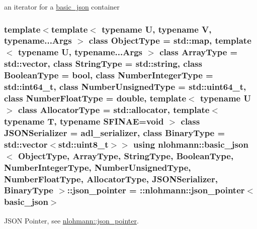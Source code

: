 an iterator for a \hyperlink{classnlohmann_1_1basic__json}{basic\+\_\+json} container 

\subsubsection[{\texorpdfstring{json\+\_\+pointer}{json_pointer}}]{\setlength{\rightskip}{0pt plus 5cm}template$<$template$<$ typename U, typename V, typename...\+Args $>$ class Object\+Type = std\+::map, template$<$ typename U, typename...\+Args $>$ class Array\+Type = std\+::vector, class String\+Type  = std\+::string, class Boolean\+Type  = bool, class Number\+Integer\+Type  = std\+::int64\+\_\+t, class Number\+Unsigned\+Type  = std\+::uint64\+\_\+t, class Number\+Float\+Type  = double, template$<$ typename U $>$ class Allocator\+Type = std\+::allocator, template$<$ typename T, typename S\+F\+I\+N\+A\+E=void $>$ class J\+S\+O\+N\+Serializer = adl\+\_\+serializer, class Binary\+Type  = std\+::vector$<$std\+::uint8\+\_\+t$>$$>$ using {\bf nlohmann\+::basic\+\_\+json}$<$ Object\+Type, Array\+Type, String\+Type, Boolean\+Type, Number\+Integer\+Type, Number\+Unsigned\+Type, Number\+Float\+Type, Allocator\+Type, J\+S\+O\+N\+Serializer, Binary\+Type $>$\+::{\bf json\+\_\+pointer} =  \+::{\bf nlohmann\+::json\+\_\+pointer}$<${\bf basic\+\_\+json}$>$}\hypertarget{classnlohmann_1_1basic__json_aa8f1f93b32da01b42413643be32b2c27}{}\label{classnlohmann_1_1basic__json_aa8f1f93b32da01b42413643be32b2c27}


J\+S\+ON Pointer, see \hyperlink{classnlohmann_1_1json__pointer}{nlohmann\+::json\+\_\+pointer}. 

